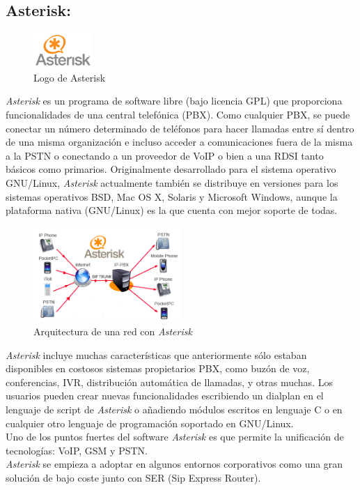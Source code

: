 \documentclass[conference]{IEEEtran}
\begin{document}
\subsection{\textbf{ Asterisk:}}
\begin{figure}[h]
	\centerline{\includegraphics[width=0.2\textwidth]{img/asterisk01.png}}
	\caption{Logo de Asterisk}
	\label{fig:ant02}
\end{figure}
\textit{Asterisk} es un programa de software libre (bajo licencia GPL) que proporciona funcionalidades de una central telefónica (PBX). Como cualquier PBX, se puede conectar un número determinado de teléfonos para hacer llamadas entre sí dentro de una misma organización e incluso acceder a comunicaciones fuera de la misma a la PSTN o conectando a un proveedor de VoIP o bien a una RDSI tanto básicos como primarios. Originalmente desarrollado para el sistema operativo GNU/Linux, \textit{Asterisk} actualmente también se distribuye en versiones para los sistemas operativos BSD, Mac OS X, Solaris y Microsoft Windows, aunque la plataforma nativa (GNU/Linux) es la que cuenta con mejor soporte de todas.\\
\begin{figure}[h]
	\centerline{\includegraphics[width=0.5\textwidth]{img/asteriksvoip00.png}}
	\caption{Arquitectura de una red con \textit{Asterisk}}
	\label{fig:ant03}
\end{figure}
\textit{Asterisk} incluye muchas características que anteriormente sólo estaban disponibles en costosos sistemas propietarios PBX, como buzón de voz, conferencias, IVR, distribución automática de llamadas, y otras muchas. Los usuarios pueden crear nuevas funcionalidades escribiendo un dialplan en el lenguaje de script de \textit{Asterisk} o añadiendo módulos escritos en lenguaje C o en cualquier otro lenguaje de programación soportado en GNU/Linux.\\
Uno de los puntos fuertes del software \textit{Asterisk} es que permite la unificación de tecnologías: VoIP, GSM y PSTN.\\
\textit{Asterisk} se empieza a adoptar en algunos entornos corporativos como una gran solución de bajo coste junto con SER (Sip Express Router).
\end{document}

